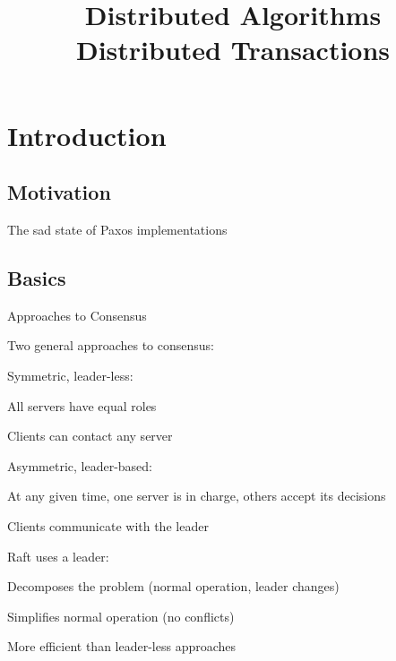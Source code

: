 
\title[DS - Distributed Transactions]{\textbf{Distributed Algorithms}\\Distributed Transactions}

\graphicspath{{figs/14/}}

\newcommand{\RED}[1]{{\small \texttt{\textcolor{darkred}{#1}}}}



\FrameContent


\section{Introduction}

\subsection{Motivation}

\begin{frame}{The sad state of Paxos implementations}
\end{frame}


\subsection{Basics}

\begin{frame}{Approaches to Consensus}

Two general approaches to consensus:
\BIL
\item Symmetric, leader-less:
	\BI
	\item All servers have equal roles
	\item Clients can contact any server
	\EI 
\item Asymmetric, leader-based:
	\BI
	\item At any given time, one server is in charge, others accept its decisions
	\item Clients communicate with the leader 
	\EI
\item Raft uses a leader:
	\BI
	\item Decomposes the problem (normal operation, leader changes)
	\item Simplifies normal operation (no conflicts)
	\item More efficient than leader-less approaches
	\EI
\EIL

\end{frame}

